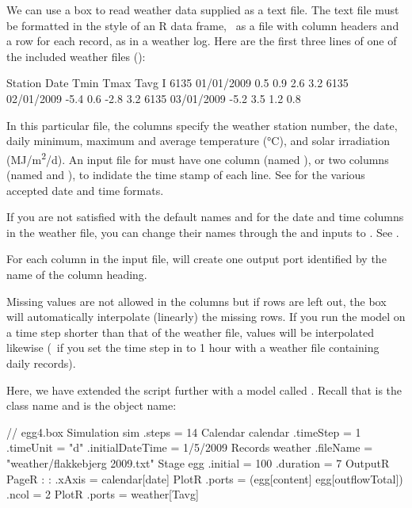 We can use a  box to read weather data supplied as a text file. The text file must be formatted in the style of an R data frame, \ie\ as a file with column headers and a row for each record, as in a weather log. Here are the first three lines of one of the included weather files ():

\lstset{tabsize=8}
\begin{boxscript}
Station  Date    Tmin  Tmax  Tavg  I
6135  01/01/2009  0.5  0.9  2.6  3.2
6135  02/01/2009  -5.4  0.6  -2.8  3.2
6135  03/01/2009  -5.2  3.5  1.2  0.8
\end{boxscript}
\lstset{tabsize=2}

In this particular file, the columns specify the weather station number, the date, daily minimum, maximum and average temperature (\si{\degreeCelsius}), and solar irradiation (\si{MJ/m^2/d}). An input file for  must have one column (named ), or two columns (named  and ), to indidate the time stamp of each line. See  for the various accepted date and time formats. 

If you are not satisfied with the default names  and  for the date and time columns in the weather file, you can change their names through the  and  inputs to . See .

For each column in the input file,  will create one output port identified by the name of the column heading.

Missing values are not allowed in the columns but if rows are left out, the  box will automatically interpolate (linearly) the missing rows. If you run the model on a time step shorter than that of the weather file, values will be interpolated likewise (\eg\ if you set the time step in  to 1 hour with a weather file containing daily records).

Here, we have extended the  script further with a  model called . Recall that  is the class name and  is the object name:

\lstset{numbers=left}
\begin{boxscript}
// egg4.box
Simulation sim {
  .steps = 14
  Calendar calendar {
    .timeStep = 1
    .timeUnit = "d"
    .initialDateTime = 1/5/2009
  }
  Records weather {
    .fileName = "weather/flakkebjerg 2009.txt"
  }
  Stage egg {
    .initial = 100 
    .duration = 7
  }
  OutputR {
    PageR {
:
:
    .xAxis = calendar[date]
      PlotR {
        .ports = (egg[content] egg[outflowTotal])   
        .ncol = 2
      }
      PlotR {
        .ports = weather[Tavg]   
      }
    }
  }
}
\end{boxscript}
\lstset{numbers=none}

